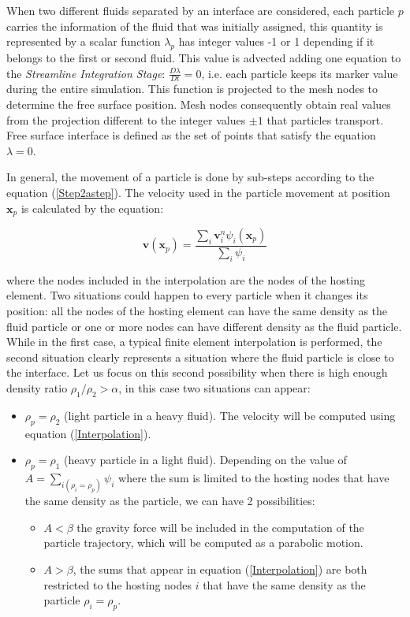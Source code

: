 When two different fluids separated by an interface are considered, each particle $p$ carries the information of the fluid that was initially assigned, this quantity is represented by a scalar function $\lambda_p$ has integer values -1 or 1 depending if it belongs to the first or second fluid. This value is advected adding one equation to the \textit{Streamline Integration Stage}: $\frac{D\lambda}{Dt}=0$, i.e. each particle keeps its marker value during the entire simulation. This function is projected to the mesh nodes to determine the free surface position. Mesh nodes consequently obtain real values from the projection different to the integer values $\pm1$ that particles transport. Free surface interface is defined as the set of points that satisfy the equation $\lambda=0$.

In general, the movement of a particle is done by sub-steps according to the equation (\ref{Step2astep}). The velocity used in the particle movement at position $\mathbf{x}_p$ is calculated by the equation:

\begin{equation}\label{Interpolation}
    \displaystyle \mathbf{v}(\mathbf{x}_p)=\frac{\sum_{i}\mathbf{v}_i^n\psi_i(\mathbf{x}_p)}{\sum_{i}\psi_i}
\end{equation}

where the nodes included in the interpolation are the nodes of the hosting element. Two situations could happen to every particle when it changes its position: all the nodes of the hosting element can have the same density as the fluid particle or one or more nodes can have different density as the fluid particle. While in the first case, a typical finite element interpolation is performed, the second situation clearly represents a situation where the fluid particle is close to the interface. Let us focus on  this second possibility when there is high enough density ratio $\rho_1/\rho_2>\alpha$, in this case two situations can appear:

 \begin{itemize}
 \item $\rho_p=\rho_2$ (light particle in a heavy fluid). The velocity will be computed using equation (\ref{Interpolation}).
   \item $\rho_p=\rho_1$ (heavy particle in a light fluid). Depending on the value of $A=\sum_{i(\rho_i=\rho_p)}\psi_i$ where the sum is limited to the hosting nodes that have the same density as the particle, we can have 2 possibilities:
       \begin{itemize}
 \item $A<\beta$ the gravity force will be included in the computation of the particle trajectory, which will be computed as a parabolic motion.
   \item $A>\beta$, the sums that appear in equation (\ref{Interpolation}) are both restricted to the hosting nodes $i$ that have the same density as the particle $\rho_i=\rho_p$.
 \end{itemize}
 \end{itemize}
 
